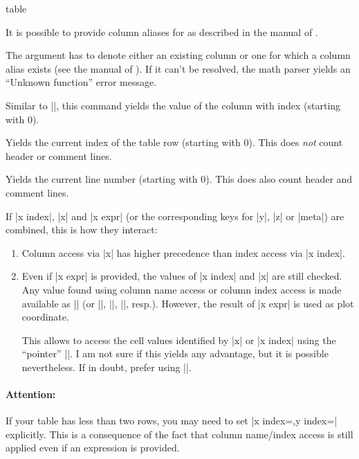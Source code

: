 {\begin{addplotoperation}[]{table}{}
\begin{command}{\thisrow{}}
		It is possible to provide column aliases for  as described in the manual of \PGFPlotstable. 

		The argument  has to denote either an existing column or one for which a column alias exists (see the manual of \PGFPlotstable). If it can't be resolved, the math parser yields an ``Unknown function'' error message.
	\end{command}
	\begin{command}{\thisrowno{}}
		Similar to |\thisrow|, this command yields the value of the column with index  (starting with $0$). 
	\end{command}
	\begin{command}{\coordindex}
		Yields the current index of the table row (starting with $0$). This does \emph{not} count header or comment lines.		
	\end{command}
	\begin{command}{\lineno}
		Yields the current line number (starting with $0$). This does also count header and comment lines.
	\end{command}

	If |x index|, |x| and |x expr| (or the corresponding keys for |y|, |z| or |meta|) are combined, this is how they interact:
	\begin{enumerate}
		\item Column access via |x| has higher precedence than index access via |x index|.
		\item Even if |x expr| is provided, the values of |x index| and |x| are still checked. Any value found using column name access or column index access is made available as |\columnx| (or |\columny|, |\columnz|, |\columnmeta|, resp.). However, the result of |x expr| is used as plot coordinate.

		This allows to access the cell values identified by |x| or |x index| using the ``pointer'' |\columnx|. I am not sure if this yields any advantage, but it is possible nevertheless. If in doubt, prefer using |\thisrow|.
	\end{enumerate}

	\paragraph{Attention:} If your table has less than two rows, you may need to set |x index={},y index={}| explicitly. This is a consequence of the fact that column name/index access is still applied even if an expression is provided.
\end{addplotoperation}

}
